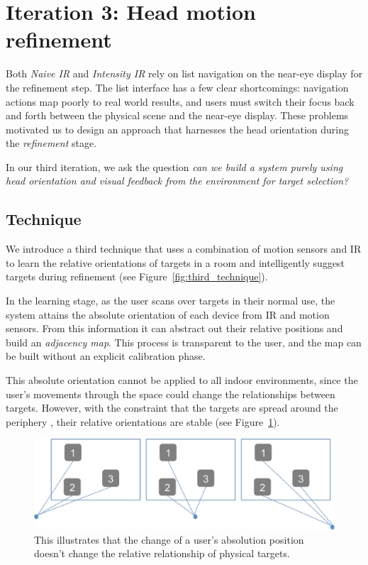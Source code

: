 \section{Iteration 3: Head motion refinement}
\label{sec:iteration-3:-head}

Both {\em Naive IR} and {\em Intensity IR} rely on list navigation on the
near-eye display for the refinement step. The list interface has a few clear
shortcomings: navigation actions map poorly to real world results, and
users must switch their focus back and forth between the physical scene and the
near-eye display. These problems motivated us to design an approach that
harnesses the head orientation during the {\em refinement} stage.

In our third iteration, we ask the question {\em can we build a system purely
using head orientation and visual feedback from the environment for target
selection?}

\subsection{Technique}

We introduce a third technique that uses a combination of motion sensors and IR
to learn the relative orientations of targets in a room and intelligently
suggest targets during refinement (see Figure~\ref{fig:third_technique}).

In the learning stage, as the user scans over targets in their normal use, the
system attains the absolute orientation of each device from IR and motion
sensors. From this information it can abstract out their relative positions and
build an {\em adjacency map}. This process is transparent to the user, and the
map can be built without an explicit calibration phase.

This absolute orientation cannot be applied to all indoor environments, since
the user's movements through the space could change the relationships between
targets. However, with the constraint that the targets are spread around the
periphery , their relative orientations are
stable (see Figure~\ref{fig:third_principle}).

\begin{figure}[t]
\centering
\includegraphics[width=0.95\columnwidth]{figures/third_principle.png}
\caption{This illustrates that the change of a user's absolution position
doesn't change the relative relationship of physical targets.}
\label{fig:third_principle}
\end{figure}

